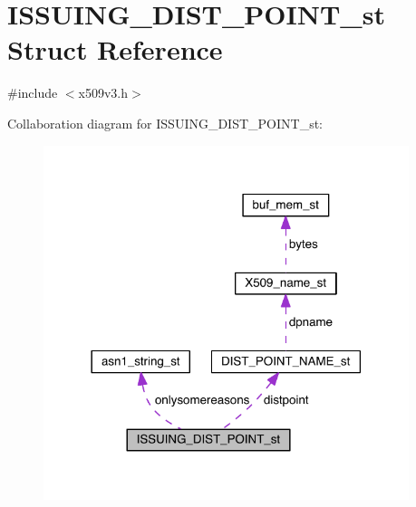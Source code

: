 \hypertarget{struct_i_s_s_u_i_n_g___d_i_s_t___p_o_i_n_t__st}{}\section{I\+S\+S\+U\+I\+N\+G\+\_\+\+D\+I\+S\+T\+\_\+\+P\+O\+I\+N\+T\+\_\+st Struct Reference}
\label{struct_i_s_s_u_i_n_g___d_i_s_t___p_o_i_n_t__st}


{\ttfamily \#include $<$x509v3.\+h$>$}



Collaboration diagram for I\+S\+S\+U\+I\+N\+G\+\_\+\+D\+I\+S\+T\+\_\+\+P\+O\+I\+N\+T\+\_\+st\+:\nopagebreak
\begin{figure}[H]
\begin{center}
\leavevmode
\includegraphics[width=302pt]{struct_i_s_s_u_i_n_g___d_i_s_t___p_o_i_n_t__st__coll__graph}
\end{center}
\end{figure}
